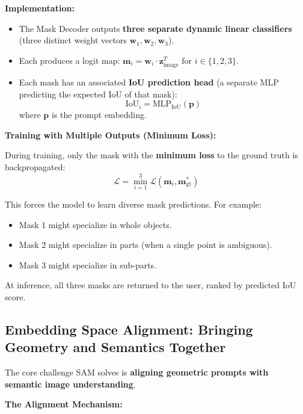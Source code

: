 \textbf{Implementation:}
\begin{itemize}
    \item The Mask Decoder outputs \textbf{three separate dynamic linear classifiers} (three distinct weight vectors $\mathbf{w}_1, \mathbf{w}_2, \mathbf{w}_3$).
    \item Each produces a logit map: $\mathbf{m}_{i} = \mathbf{w}_i \cdot \mathbf{z}_{\text{image}}^T$ for $i \in \{1, 2, 3\}$.
    \item Each mask has an associated \textbf{IoU prediction head} (a separate MLP predicting the expected IoU of that mask):
      \[ \text{IoU}_i = \text{MLP}_{\text{IoU}}(\mathbf{p}) \]
      where $\mathbf{p}$ is the prompt embedding.
\end{itemize}

\textbf{Training with Multiple Outputs (Minimum Loss):}

During training, only the mask with the \textbf{minimum loss} to the ground truth is backpropagated:
\[ \mathcal{L} = \min_{i=1}^{3} \mathcal{L}(\mathbf{m}_i, \mathbf{m}^*_{\text{gt}}) \]

This forces the model to learn diverse mask predictions. For example:
\begin{itemize}
    \item Mask 1 might specialize in whole objects.
    \item Mask 2 might specialize in parts (when a single point is ambiguous).
    \item Mask 3 might specialize in sub-parts.
\end{itemize}

At inference, all three masks are returned to the user, ranked by predicted IoU score.

\subsection{Embedding Space Alignment: Bringing Geometry and Semantics Together}

The core challenge SAM solves is \textbf{aligning geometric prompts with semantic image understanding}.

\textbf{The Alignment Mechanism:}

